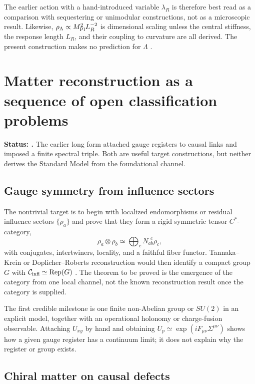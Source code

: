 The earlier action with a hand-introduced variable \(\lambda_R\) is therefore
best read as a comparison with sequestering or unimodular constructions, not
as a microscopic result.  Likewise,
\(\rho_\Lambda\propto M_{\rm Pl}^2L_R^{-2}\) is dimensional scaling unless
the central stiffness, the response length \(L_R\), and their coupling to
curvature are all derived.  The present construction makes no prediction for
\(\Lambda\) \cite{FiolGarriga2010,KaloperPadilla,WeinbergCC}.

\section{Matter reconstruction as a sequence of open classification
problems}
\label{sec:updated-matter}

\textbf{Status: \StatusOpen.}
The earlier long form attached gauge registers to causal links and imposed a
finite spectral triple.  Both are useful target constructions, but neither
derives the Standard Model from the foundational channel.

\subsection{Gauge symmetry from influence sectors}

The nontrivial target is to begin with localized endomorphisms or residual
influence sectors \(\{\rho_a\}\) and prove that they form a rigid symmetric
tensor \(C^*\)-category,
\begin{equation}
 \rho_a\otimes\rho_b
 \simeq\bigoplus_cN_{ab}^{\ \ c}\rho_c ,
 \label{eq:updated-fusion}
\end{equation}
with conjugates, intertwiners, locality, and a faithful fiber functor.
Tannaka--Krein or Doplicher--Roberts reconstruction would then identify a
compact group \(G\) with
\(\mathcal C_{\rm infl}\simeq\operatorname{Rep}(G)\)
\cite{DoplicherRoberts}.  The theorem to be
proved is the emergence of the category from one local channel, not the
known reconstruction result once the category is supplied.

The first credible milestone is one finite non-Abelian group or \(SU(2)\) in
an explicit model, together with an operational holonomy or charge-fusion
observable.  Attaching \(U_{xy}\) by hand and obtaining
\(U_p\simeq\exp(iF_{\mu\nu}\Sigma^{\mu\nu})\) shows how a given gauge register
has a continuum limit; it does not explain why the register or group exists.

\subsection{Chiral matter on causal defects}

